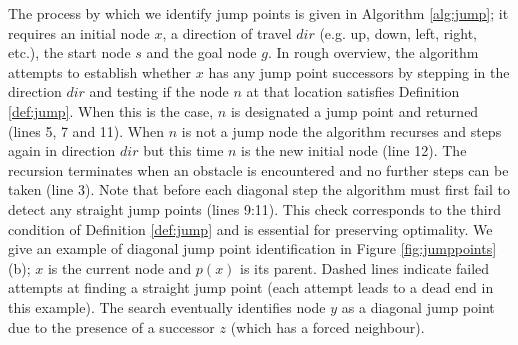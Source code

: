 The process by which we identify jump points is given in Algorithm
\ref{alg:jump}; it requires an initial node $x$, a direction of travel $dir$
(e.g. up, down, left, right, etc.), the start node $s$ and the goal node $g$.
In rough overview, the algorithm attempts to establish whether $x$ has any 
jump point successors by stepping in the direction $dir$ and testing
if the node $n$ at that location satisfies Definition \ref{def:jump}.
When this is the case, $n$ is designated a jump point and returned (lines 5, 7
and 11).
When $n$ is not a jump node the algorithm recurses and steps again in direction
$dir$ but this time $n$ is the new initial node (line 12).
The recursion terminates when an obstacle is encountered and no further
steps can be taken (line 3).
Note that before each diagonal step the algorithm must first 
fail to detect any straight jump points (lines 9:11). 
This check corresponds to the third condition of Definition \ref{def:jump} 
and is essential for preserving optimality.
We give an example of diagonal jump point identification in Figure
\ref{fig:jumppoints}(b); $x$ is the current node and $p(x)$ is its parent.
Dashed lines indicate failed attempts at finding a straight jump point (each
attempt leads to a dead end in this example). 
The search eventually identifies node $y$ as a diagonal jump point due to the
presence of a successor $z$ (which has a forced neighbour).
